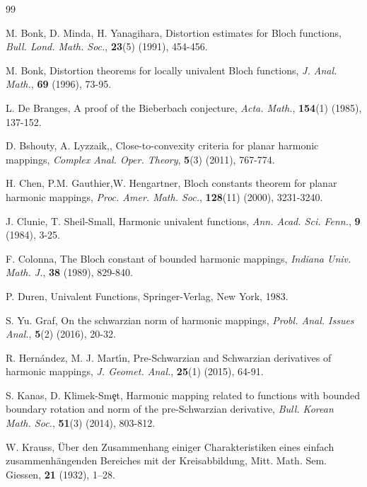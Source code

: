 \documentclass[a4paper,12pt]{amsart}
\theoremstyle{definition}
\begin{document}
\begin{thebibliography}{99}
		
		{\sc M. Bonk, D. Minda, H. Yanagihara}, Distortion estimates for {B}loch functions, {\it Bull. Lond. Math. Soc.}, {\bf 23}(5) (1991), 454-456.
		
		{\sc M. Bonk}, Distortion theorems for locally univalent {B}loch functions, {\it J. Anal. Math.}, {\bf 69} (1996), 73-95.
		
		
		
		
		
		{\sc L. De Branges}, A proof of the Bieberbach conjecture, {\it Acta. Math.}, {\bf 154}(1) (1985), 137-152.
		
		
		{\sc D. Bshouty, A. Lyzzaik,},  Close-to-convexity criteria for planar harmonic mappings,    {\it Complex Anal. Oper. Theory}, {\bf 5}(3) (2011), 767-774.
		
		
		{\sc H. Chen, P.M. Gauthier,W.  Hengartner}, Bloch constants theorem for planar harmonic mappings, {\it Proc. Amer. Math. Soc.}, {\bf 128}(11) (2000), 3231-3240.
		
		
		{\sc J. Clunie, T. Sheil-Small}, Harmonic univalent functions, {\it Ann. Acad. Sci. Fenn.}, {\bf 9} (1984), 3-25.
		
		
		{\sc F. Colonna}, The Bloch constant of bounded harmonic mappings, {\it Indiana Univ. Math. J.}, {\bf 38} (1989), 829-840.
		
		
		 {\sc P. Duren}, Univalent Functions, Springer-Verlag, New York, 1983.
		
		
		
		{\sc S. Yu. Graf}, On the schwarzian norm of harmonic mappings, {\it Probl. Anal. Issues Anal.}, {\bf 5}(2) (2016), 20-32.
		
		
		{\sc R. Hern{\'a}ndez, M. J. Mart{\'\i}n},  Pre-Schwarzian and Schwarzian derivatives of harmonic mappings, {\it J. Geomet. Anal.}, {\bf 25}(1)  (2015), 64-91.
		
		
		{\sc S. Kanas, D. Klimek-Sm\c{e}t}, Harmonic mapping related to functions with bounded boundary rotation and norm of the pre-Schwarzian derivative, {\it Bull. Korean Math. Soc.}, {\bf 51}(3)  (2014), 803-812.
		
		
		 {\sc W. Krauss}, {\"U}ber den Zusammenhang einiger Charakteristiken eines einfach zusammenh{\"a}ngenden Bereiches mit der Kreisabbildung, Mitt. Math. Sem. Giessen, {\bf 21} (1932), 1–28.
		

\end{thebibliography}
\end{document}

